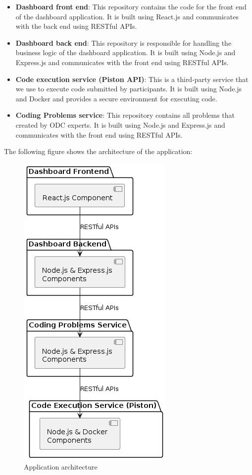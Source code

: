 \begin{itemize}
      \item \textbf{Dashboard front end}: This repository contains the code for the
            front end of the dashboard application. It is built using React.js and
            communicates with the back end using RESTful APIs.

      \item \textbf{Dashboard back end}: This repository is responsible for handling the
            business logic of the dashboard application. It is built using Node.js
            and Express.js and communicates with the front end using RESTful APIs.

      \item \textbf{Code execution service (Piston API)}: This is a third-party service
            that we use to execute code submitted by participants. It is built
            using Node.js and Docker and provides a secure environment for
            executing code.

      \item \textbf{Coding Problems service}: This repository contains all problems that created
            by ODC experts. It is built using Node.js and Express.js and communicates with
            the front end using RESTful APIs.
\end{itemize}

The following figure shows the architecture of the application:
\begin{figure}[h!]
      \centering
      \includegraphics[height=1\textwidth]{../images/softwareArchitecture.png}
      \caption{Application architecture}
      \label{fig:architecture}
\end{figure}